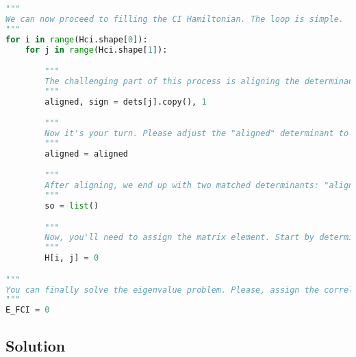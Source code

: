 \begin{lstlisting}[language=Python, caption={\acrshort{ci} exercise code.}, label=code:ci_exercise]
"""
We can now proceed to filling the CI Hamiltonian. The loop is simple.
"""
for i in range(Hci.shape[0]):
    for j in range(Hci.shape[1]):

        """
        The challenging part of this process is aligning the determinants. In this step, I transfer the contents of the j-th determinant into the "aligned" determinant. It's important not to alter the j-th determinant directly within its original place, as doing so could disrupt the computation of other matrix elements. Instead, we carry out the next steps on the determinant now contained in the "aligned" variable. Additionally, the element sign is defined at this stage. You probably want to leave this unchanged.
        """
        aligned, sign = dets[j].copy(), 1

        """
        Now it's your turn. Please adjust the "aligned" determinant to match the i-th determinant as closely as possible. By "align", I mean you should execute a series of spinorbital swaps to minimize the differences between the "aligned" and the i-th determinant. It's also important to monitor the number of swaps you make, as each swap affects the sign of the determinant, hence the reason for the "sign" variable defined earlier. This task is not straightforward, so don't hesitate to reach out to the authors if you need guidance.
        """
        aligned = aligned

        """
        After aligning, we end up with two matched determinants: "aligned" and "dets[i]". At this point, we can apply the Slater-Condon rules. I suggested earlier that the input for these rules should be an array combining both unique and common spinorbitals. You can prepare this array now. However, if you've designed your Slater-Condon rules to directly accept the determinants instead, you can skip this preparatory step.
        """
        so = list()

        """
        Now, you'll need to assign the matrix element. Start by determining the number of differences between the two determinants. Based on this number, apply the corresponding Slater-Condon rule. Don't forget to multiply the result by the sign to account for any changes due to swaps made during the alignment of the determinants.
        """
        H[i, j] = 0

"""
You can finally solve the eigenvalue problem. Please, assign the correlation energy to the "E_FCI" variable.
"""
E_FCI = 0
\end{lstlisting}

\subsection{Solution}


